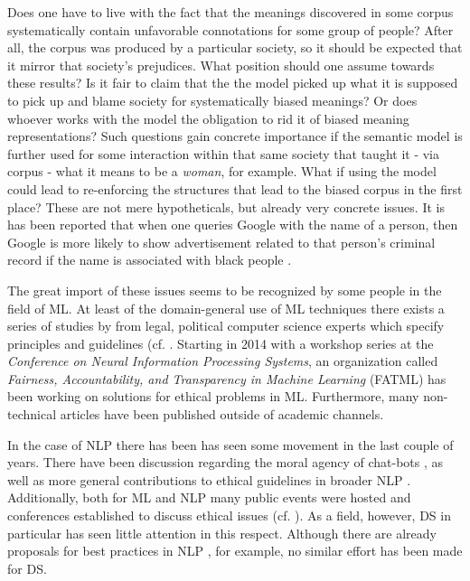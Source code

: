 \documentclass{article}
\begin{document}
Does one have to live with the fact that the meanings discovered in some corpus systematically contain unfavorable connotations for some group of people? After all, the corpus was produced by a particular society, so it should be expected that it mirror that society's prejudices. What position should one assume towards these results? Is it fair to claim that the the model picked up what it is supposed to pick up and blame society for systematically biased meanings? Or does whoever works with the model the obligation to rid it of biased meaning representations? Such questions gain concrete importance if the semantic model is further used for some interaction within that same society that taught it - via corpus - what it means to be a \emph{woman}, for example. What if using the model could lead to re-enforcing the structures that lead to the biased corpus in the first place? These are not mere hypotheticals, but already very concrete issues. It is has been reported that when one queries Google with the name of a person, then Google is more likely to show advertisement related to that person's criminal record if the name is associated with black people \cite{sweeney2013discrimination}.

The great import of these issues seems to be recognized by some people in the field of ML. At least of the domain-general use of ML techniques there exists a series of studies by from legal, political computer science experts which specify principles and guidelines (cf. \cite{pasquale2015black}\cite{feldman2015certifying}\cite{barocas2016big}. Starting in 2014 with a workshop series at the \emph{Conference on Neural Information Processing Systems}, an organization called \emph{Fairness, Accountability, and Transparency in Machine Learning} (FATML) has been working on solutions for ethical problems in ML. Furthermore, many non-technical articles have been published outside of academic channels. 

In the case of NLP there has been  has seen some movement in the last couple of years. There have been discussion regarding the moral agency of chat-bots \cite{thieltges2016devil}, as well as more general contributions to ethical guidelines in broader NLP \cite{hovy2016social}.
Additionally, both for ML and NLP many public events were hosted and conferences established to discuss ethical issues (cf. \cite{conferences}).
As a field, however, DS in particular has seen little attention in this respect. Although there are already proposals for best practices in NLP \cite{leidner2017ethical}, for example, no similar effort has been made for DS.
\end{document}
